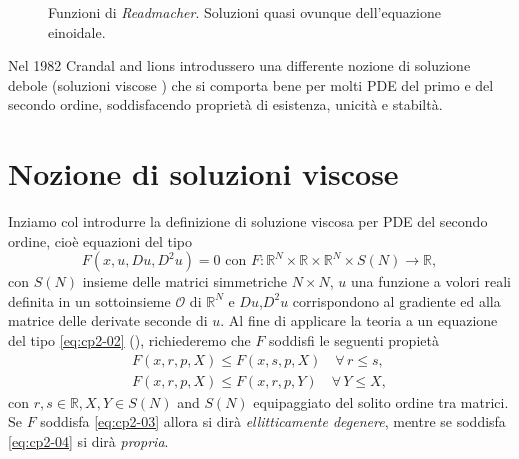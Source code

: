 \begin{figure}[!htb]
  \begin{center}
  \end{center}
  \caption{Funzioni di \emph{Readmacher}. Soluzioni quasi ovunque dell'equazione einoidale.}
  \label{fig:cp2-01}
\end{figure}

Nel 1982 Crandal and lions introdussero una differente nozione di soluzione debole (soluzioni viscose \cite[vedi][]{crand:lion}) che si comporta bene per molti PDE del primo e del secondo ordine, soddisfacendo proprietà di esistenza, unicità e stabiltà. 
%
%
%
\section{Nozione di soluzioni viscose}
Inziamo col introdurre la definizione di soluzione viscosa per PDE del secondo ordine, cioè equazioni del tipo
\begin{equation}
\label{eq:cp2-02}
F(x,u,Du,D^2u) = 0\text{ con }F:\mathbb{R}^N\times\mathbb{R}\times\mathbb{R}^N\times S(N)\to \mathbb{R},
\end{equation}
con $S(N)$ insieme delle matrici simmetriche $N\times N$, $u$ una funzione a volori reali definita in un sottoinsieme $\mathcal{O}$ di $\mathbb{R}^N$ e $Du$,$D^2u$ corrispondono al gradiente ed alla matrice delle derivate seconde di $u$. Al fine di applicare la teoria a un equazione del tipo \eqref{eq:cp2-02} (\cite[vedi][2]{crand:lion}), richiederemo che $F$ soddisfi le seguenti propietà
\begin{gather}
\label{eq:cp2-03}
F(x,r,p,X) \leq F(x,s,p,X) \quad \forall\,r\leq s,\\
\label{eq:cp2-04}
F(x,r,p,X) \leq F(x,r,p,Y) \quad \forall\,Y\leq X,
\end{gather}
con $r,s\in \mathbb{R},X,Y\in S(N)$ and $S(N)$ equipaggiato del solito ordine tra matrici. Se $F$ soddisfa \eqref{eq:cp2-03} allora si dirà \emph{ellitticamente degenere}, mentre se soddisfa \eqref{eq:cp2-04} si dirà \emph{propria}.


